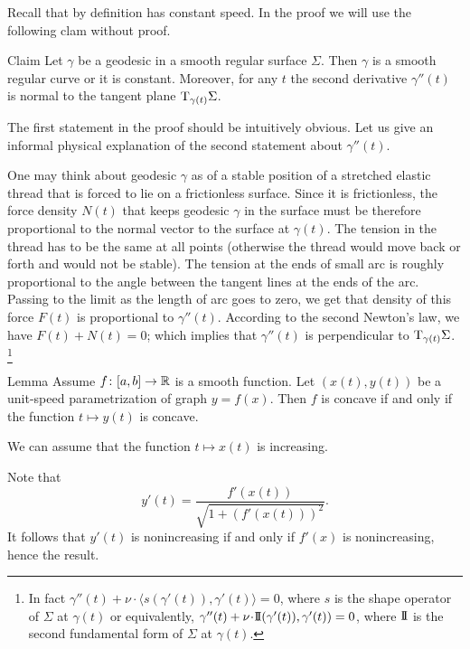 Recall that by definition has constant speed.
In the proof we will use the following clam without proof.

\begin{thm}{Claim}\label{clm:gamma''}
Let $\gamma$ be a geodesic in a smooth regular surface $\Sigma$.
Then $\gamma$ is a smooth regular curve or it is constant.
Moreover, for any $t$ the second derivative $\gamma''(t)$ is normal to the tangent plane $\mathrm{T}_{\gamma(t)}\Sigma$.
\end{thm}

The first statement in the proof should be intuitively obvious.
Let us give an informal physical explanation of the second statement about $\gamma''(t)$.

One may think about geodesic $\gamma$ as of a stable position of a stretched elastic thread that is forced to lie on a frictionless surface.
Since it is frictionless, the force density $N(t)$ that keeps geodesic $\gamma$ in the surface must be therefore proportional to the normal vector to the surface at $\gamma(t)$.
The tension in the thread has to be the same at all points (otherwise the thread would move back or forth and would not be stable).
The tension at the ends of small arc is roughly proportional to the angle between the tangent lines at the ends of the arc. 
Passing to the limit as the length of arc goes to zero, we get that density of this force $F(t)$ is proportional to $\gamma''(t)$.
According to the second Newton's law, we have $F(t)+N(t)=0$;
which implies that  $\gamma''(t)$ is perpendicular to $\mathrm{T}_{\gamma(t)}\Sigma$.%
\footnote{In fact $\gamma''(t)+\nu\cdot \langle s(\gamma'(t)),\gamma'(t)\rangle=0$, where $s$ is the shape operator of $\Sigma$ at $\gamma(t)$ or equivalently,
$\gamma''(t)+\nu\cdot  \II(\gamma'(t)),\gamma'(t))=0$, where $\mathrm{I}\!\mathrm{I}$ is the second fundamental form of $\Sigma$ at $\gamma(t)$.}

\begin{thm}{Lemma}\label{lem:unit-speed} Assume $f\colon[a,b]\to\mathbb{R}$ is a smooth  function. 
Let $(x(t),y(t))$ be a unit-speed parametrization of graph $y=f(x)$.
Then $f$ is concave if and only if the function $t\mapsto y(t)$ is concave.
\end{thm}

We can assume that the function $t\mapsto x(t)$ is increasing.

Note that 
\[y'(t)=\frac{f'(x(t))}{\sqrt{1+(f'(x(t)))^2}}.\]
It follows that  $y'(t)$ is nonincreasing if and only if $f'(x)$ is nonincreasing, hence the result.
\qeds

